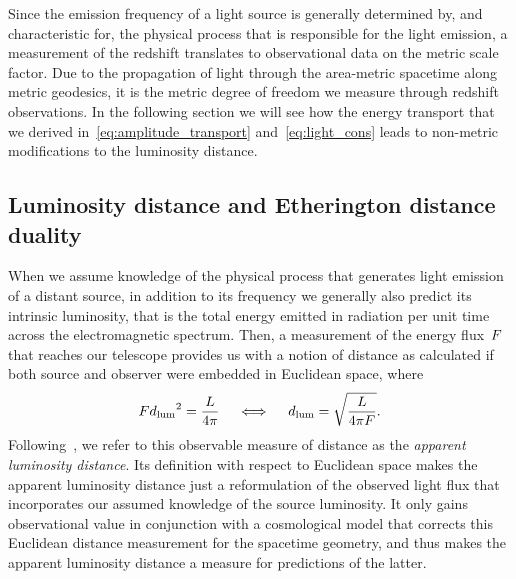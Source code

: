 Since the emission frequency of a light source is generally determined by, and characteristic for, the physical process that is responsible for the light emission, a measurement of the redshift translates to observational data on the metric scale factor. Due to the propagation of light through the area-metric spacetime along metric geodesics, it is the metric degree of freedom we measure through redshift observations. In the following section we will see how the energy transport that we derived in~\eqref{eq:amplitude_transport} and~\eqref{eq:light_cons} leads to non-metric modifications to the luminosity distance.

\subsection{Luminosity distance and Etherington distance duality}

When we assume knowledge of the physical process that generates light emission of a distant source, in addition to its frequency we generally also predict its intrinsic luminosity, that is the total energy emitted in radiation per unit time across the electromagnetic spectrum. Then, a measurement of the energy flux~$F$ that reaches our telescope provides us with a notion of distance as calculated if both source and observer were embedded in Euclidean space, where
\begin{equation}\label{eq:def_dlum}
	F{d_\mathrm{lum}}^2=\frac{L}{4\pi} \quad \iff \quad {d_\mathrm{lum}}=\sqrt{\frac{L}{4\pi F}}
	\mathpunct{.}
\end{equation}
Following~\autocite{SchneiderGravlens}, we refer to this observable measure of distance as the \emph{apparent luminosity distance}. Its definition with respect to Euclidean space makes the apparent luminosity distance just a reformulation of the observed light flux that incorporates our assumed knowledge of the source luminosity. It only gains observational value in conjunction with a cosmological model that corrects this Euclidean distance measurement for the spacetime geometry, and thus makes the apparent luminosity distance a measure for predictions of the latter.


